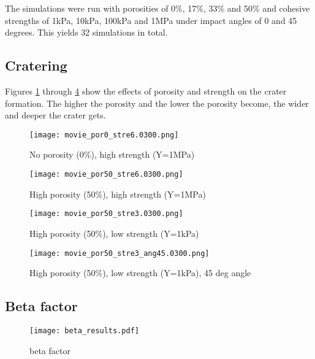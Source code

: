The simulations were run with porosities of 0\%, 17\%, 33\% and 50\% and cohesive strengths of 1kPa, 10kPa, 100kPa and 1MPa under impact angles of 0 and 45 degrees. This yields 32 simulations in total.

\subsection{Cratering}
Figures \ref{fig:crater1} through \ref{fig:crater4} show the effects of porosity and strength on the crater formation. The higher the porosity and the lower the porosity become, the wider and deeper the crater gets.

\begin{figure}
   \centering
   \texttt{[image: movie\_por0\_stre6.0300.png]}
   \caption{No porosity (0\%), high strength (Y=1MPa)}
   \label{fig:crater1}
\end{figure}

\begin{figure}
   \centering
   \texttt{[image: movie\_por50\_stre6.0300.png]}
   \caption{High porosity (50\%), high strength (Y=1MPa)}
   \label{fig:crater2}
\end{figure}

\begin{figure}
   \centering
   \texttt{[image: movie\_por50\_stre3.0300.png]}
   \caption{High porosity (50\%), low strength (Y=1kPa)}
   \label{fig:crater3}
\end{figure}

\begin{figure}
   \centering
   \texttt{[image: movie\_por50\_stre3\_ang45.0300.png]}
   \caption{High porosity (50\%), low strength (Y=1kPa), 45 deg angle}
   \label{fig:crater4}
\end{figure}


\subsection{Beta factor}
\begin{figure}
   \centering
   \texttt{[image: beta\_results.pdf]}
   \caption{beta factor}
   \label{fig:beta_factor}
\end{figure}